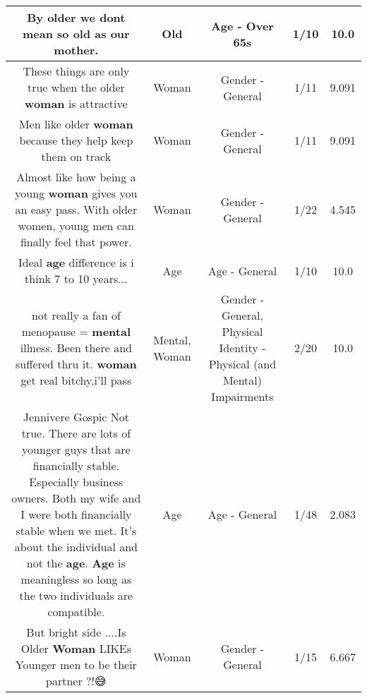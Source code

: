 \documentclass[11pt]{article}
\newlength\mylength
\begin{document}
\begin{center}
\begin{longtable}{|C{.65\mylength}|C{.30\mylength}|C{.12\mylength}|C{.12\mylength}|C{.12\mylength}|}
  \small By older we dont mean so \textbf{old} as our mother.\normalsize   & Old & Age - Over 65s & 1/10 & 10.0 \\  \hline
  \small These things are only true when the older \textbf{woman} is attractive\normalsize   & Woman & Gender - General & 1/11 & 9.091 \\  \hline
  \small Men like older \textbf{woman} because they help keep them on track\normalsize   & Woman & Gender - General & 1/11 & 9.091 \\  \hline
  \small Almost like how being a young \textbf{woman} gives you an easy pass. With older women, young men can finally feel that power.\normalsize   & Woman & Gender - General & 1/22 & 4.545 \\  \hline
  \small Ideal \textbf{age} difference is i think 7 to 10 years...\normalsize   & Age & Age - General & 1/10 & 10.0 \\  \hline
  \small not really a fan of menopause = \textbf{mental} illness. Been there and suffered thru it. \textbf{woman} get real bitchy,i'll pass\normalsize   & Mental, Woman & Gender - General, Physical Identity - Physical (and Mental) Impairments & 2/20 & 10.0 \\  \hline
  \small Jennivere Gospic Not true. There are lots of younger guys that are financially stable. Especially business owners. Both my wife and I were both financially stable when we met.  It's about the individual and not the \textbf{age}. \textbf{Age} is meaningless so long as the two individuals are compatible.\normalsize   & Age & Age - General & 1/48 & 2.083 \\  \hline
  \small But bright side ....Is Older \textbf{Woman} LIKEs Younger men to be their partner ?!😅\normalsize   & Woman & Gender - General & 1/15 & 6.667 \\  \hline

\end{longtable}
\end{center}
\end{document}
